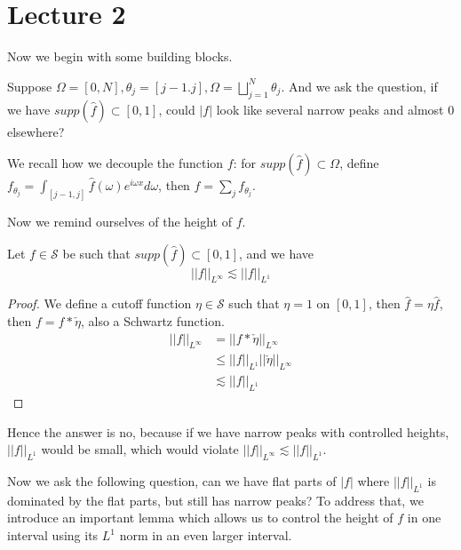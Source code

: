 \section*{Lecture 2}
Now we begin with some building blocks.

Suppose $\Omega=[0,N], \theta_j=[j-1. j], \Omega=\bigsqcup_{j=1}^N\theta_j$. And we ask the question, if we have $supp(\widehat{f})\subset[0,1]$, could $|f|$ look like several narrow peaks and almost 0 elsewhere?

We recall how we decouple the function $f$: for $supp(\widehat{f})\subset\Omega$, define $f_{\theta_j}=\int_{[j-1, j]}\widehat{f}(\omega)e^{i\omega x}d\omega$, then $f=\sum_jf_{\theta_j}$.

Now we remind ourselves of the height of $f$.
\begin{proposition}
    Let $f\in\mathcal{S}$ be such that $supp(\widehat{f})\subset[0,1]$, and we have
    \begin{equation*}
        ||f||_{L^\infty}\lesssim||f||_{L^1}
    \end{equation*}
\end{proposition}
\begin{proof}
    We define a cutoff function $\eta\in\mathcal{S}$ such that $\eta=1$ on $[0,1]$, then $\widehat{f}=\eta\widehat{f}$, then $f=f\ast\check{\eta}$, also a Schwartz function.
\begin{align*}
    ||f||_{L^\infty}&=||f\ast\check{\eta}||_{L^\infty}\\
    &\leq||f||_{L^1}||\check{\eta}||_{L^\infty}\\
    &\lesssim||f||_{L^1}
\end{align*}
\end{proof}
Hence the answer is no, because if we have narrow peaks with controlled heights, $||f||_{L^1}$ would be small, which would violate $||f||_{L^\infty}\lesssim||f||_{L^1}$.

Now we ask the following question, can we have flat parts of $|f|$ where $||f||_{L^1}$ is dominated by the flat parts, but still has narrow peaks? To address that, we introduce an important lemma which allows us to control the height of $f$ in one interval using its $L^1$ norm in an even larger interval.

\begin{proposition}
    
\end{proposition}